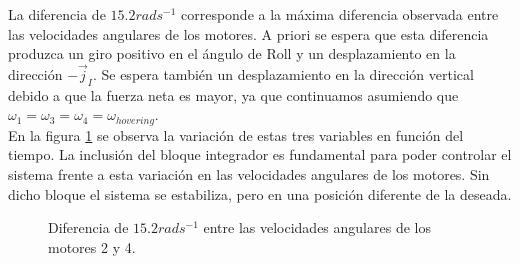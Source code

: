 \documentclass[main]{subfiles}
\begin{document}
La diferencia de $15.2rads^{-1}$ corresponde a la m\'axima diferencia observada entre las velocidades angulares de los motores. A priori se espera que esta diferencia produzca un giro positivo en el \'angulo de Roll y un desplazamiento en la direcci\'on $-\vec{j}_I$. Se espera tambi\'en un desplazamiento en la direcci\'on vertical debido a que la fuerza neta es mayor, ya que continuamos asumiendo que $\omega_1 = \omega_3 = \omega_4 =\omega_{hovering}$.\\

En la figura  \ref{fig:motor} se observa la variaci\'on de estas tres variables en funci\'on del tiempo. La inclusi\'on del bloque integrador es fundamental para poder controlar el sistema frente a esta variaci\'on en las velocidades angulares de los motores. Sin dicho bloque el sistema se estabiliza, pero en una posici\'on diferente de la deseada.\\

\begin{figure}
  \centering
 
  \caption{Diferencia de $15.2 rad s^{-1}$ entre las velocidades angulares de los motores 2 y 4.}
  \label{fig:motor}
\end{figure}
\end{document}
